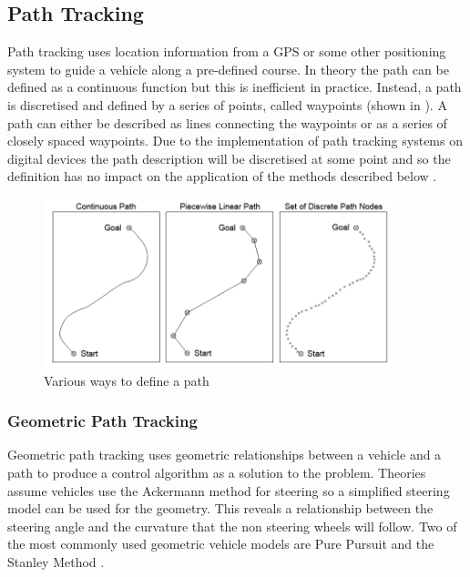 \documentclass[main.tex]{subfiles}
\begin{document}
\subsection{Path Tracking}
Path tracking uses location information from a GPS or some other positioning system to guide a vehicle along a pre-defined course. In theory the path can be defined as a continuous function but this is inefficient in practice. Instead, a path is discretised and defined by a series of points, called waypoints (shown in ). A path can either be described as lines connecting the waypoints or as a series of closely spaced waypoints. Due to the implementation of path tracking systems on digital devices the path description will be discretised at some point and so the definition has no impact on the application of the methods described below \parencite{Giesbrecht2005}.
\begin{figure}[ht]
\includegraphics[width=0.9\textwidth]{3-LiteratureReview/pathDefining.png}
\centering
\caption[Various ways to define a path]{Various ways to define a path \parencite{Giesbrecht2005}} 
\end{figure}

\subsubsection{Geometric Path Tracking}
Geometric path tracking uses geometric relationships between a vehicle and a path to produce a control algorithm as a solution to the problem. Theories assume vehicles use the Ackermann method for steering so a simplified steering model can be used for the geometry. This reveals a relationship between the steering angle and the curvature that the non steering wheels will follow. Two of the most commonly used geometric vehicle models are Pure Pursuit and the Stanley Method \parencite{snider2009}.
\end{document}
